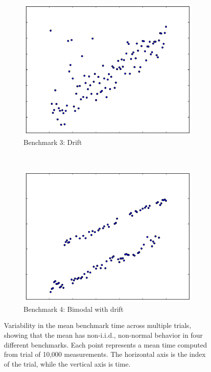 \documentclass[conference]{IEEEtran}
\begin{document}
\begin{figure}
\begin{subfigure}{0.22\textwidth}
    \centering
    \includegraphics[width=\textwidth]{figures/fig1/drift_manyallocs_slow}
    \caption{Benchmark 3: Drift}
\end{subfigure}
~
\begin{subfigure}{0.22\textwidth}
    \centering
    \includegraphics[width=\textwidth]{figures/fig1/bimodal_drift_sumindex}
    \caption{Benchmark 4: Bimodal with drift}
\end{subfigure}
\caption{Variability in the mean benchmark time across multiple trials, showing
that the mean has non-i.i.d., non-normal behavior in four different benchmarks.
Each point represents a mean time computed from trial of 10,000 measurements.
The horizontal axis is the index of the trial, while the vertical axis is time.}
\label{fig:meandistributions}
\vspace{-0.45cm} %
\end{figure}
\end{document}
